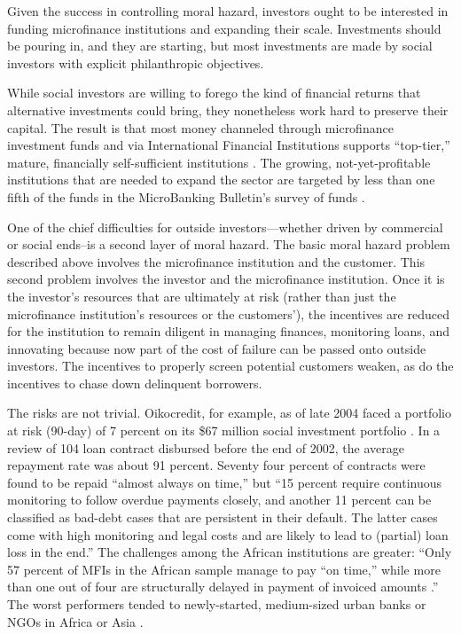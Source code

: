 \documentclass[letterpaper, 12pt]{article}
\begin{document}

Given the success in controlling moral hazard, investors ought to be interested in funding microfinance institutions and expanding their
scale. Investments should be pouring in, and they are starting, but most investments are made by social investors with explicit philanthropic
objectives.

While social investors are willing to forego the kind of financial returns that alternative investments could bring, they nonetheless work
hard to preserve their capital. The result is that most money channeled through microfinance investment funds and via International Financial
Institutions supports ``top-tier,'' mature, financially self-sufficient institutions \citep{stauffenberg2007}. The growing, not-yet-profitable institutions that are needed to expand the sector are targeted by less than one fifth of the funds in the MicroBanking Bulletin's survey of funds \citep[][53]{bruett2005}.


One of the chief difficulties for outside investors---whether driven by commercial or social ends--is a second layer of moral hazard. The basic moral hazard problem described above involves the microfinance institution and the customer. This second problem involves the investor and the microfinance institution. Once it is the investor's resources that are ultimately at risk (rather than just the microfinance institution's resources or the customers'), the incentives are reduced for the institution to remain diligent in managing finances, monitoring loans, and innovating because now part of the cost of failure can be passed onto outside investors. The incentives to properly screen potential customers weaken, as do the incentives to chase down delinquent borrowers.

The risks are not trivial. Oikocredit, for example, as of late 2004 faced a portfolio at risk (90-day) of 7 percent on its \$67 million
social investment portfolio \citep[][33]{heinen2005}. In a review of 104 loan contract disbursed before the end of 2002, the average repayment rate
was about 91 percent. Seventy four percent of contracts were found to be repaid ``almost always on time,'' but ``15 percent require continuous
monitoring to follow overdue payments closely, and another 11 percent can be classified as bad-debt cases that are persistent in their default. The latter cases come with high monitoring and legal costs and are likely to lead to (partial) loan loss in the end.'' The challenges among the African institutions are greater: ``Only 57 percent of MFIs in the African sample manage to pay ``on time,'' while more than one out of
four are structurally delayed in payment of invoiced amounts \citep[][34-35]{heinen2005} .'' The worst performers tended to newly-started,
medium-sized urban banks or NGOs in Africa or Asia \citep[][39]{heinen2005}.
\end{document}
